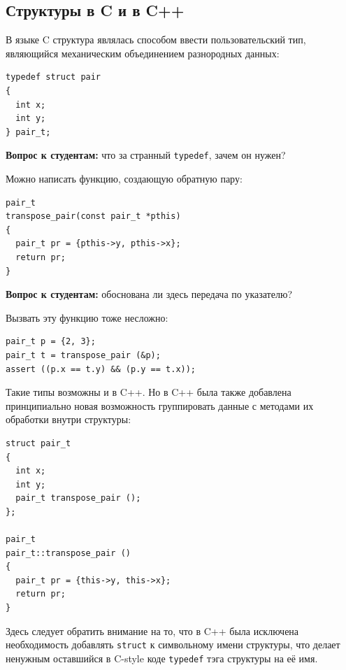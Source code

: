\documentclass[a4paper,12pt,oneside]{article}
\newif\ifanswers
\begin{document}
\subsection{Структуры в C и в C++}\label{CCppStructs}

В языке C структура являлась способом ввести пользовательский тип, являющийся механическим объединением разнородных данных:

\begin{lstlisting}
typedef struct pair 
{ 
  int x; 
  int y; 
} pair_t;
\end{lstlisting}

\textbf{Вопрос к студентам:} что за странный \lstinline!typedef!, зачем он нужен?

\ifanswers
Правильный ответ: это стандартная идиома, чтобы в коде на C не писать лишний раз \lstinline!struct pair! в два слова.
\fi

Можно написать функцию, создающую обратную пару:

\begin{lstlisting}
pair_t 
transpose_pair(const pair_t *pthis)
{
  pair_t pr = {pthis->y, pthis->x};
  return pr;
} 
\end{lstlisting}

\textbf{Вопрос к студентам:} обоснована ли здесь передача по указателю?

\ifanswers
Правильный ответ: на грани. Указатель может занимать больше места, чем два целых, может и меньше.
\fi

Вызвать эту функцию тоже несложно:

\begin{lstlisting}
pair_t p = {2, 3};
pair_t t = transpose_pair (&p);
assert ((p.x == t.y) && (p.y == t.x));
\end{lstlisting}

Такие типы возможны и в C++. Но в C++ была также добавлена принципиально новая возможность группировать данные с методами их обработки внутри структуры:

\begin{lstlisting}
struct pair_t 
{ 
  int x; 
  int y;
  pair_t transpose_pair (); 
};

pair_t 
pair_t::transpose_pair ()
{
  pair_t pr = {this->y, this->x};
  return pr;
} 
\end{lstlisting}

Здесь следует обратить внимание на то, что в C++ была исключена необходимость добавлять \lstinline!struct! к символьному имени структуры, что делает ненужным оставшийся в C-style коде \lstinline!typedef! тэга структуры на её имя.
\end{document}
